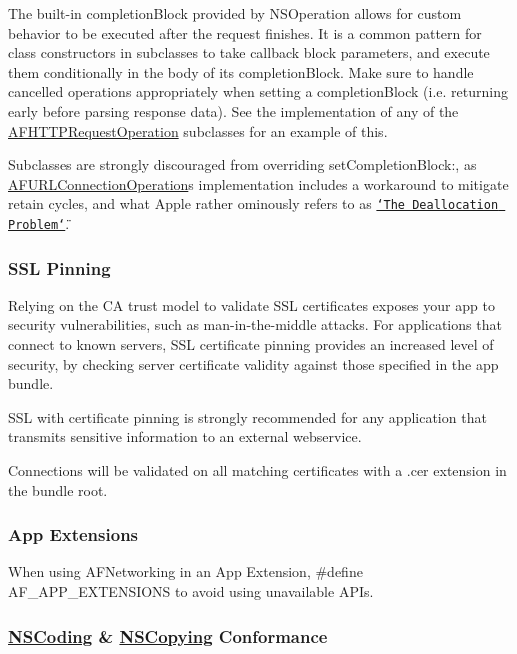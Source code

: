 The built-\/in {\ttfamily completion\+Block} provided by {\ttfamily N\+S\+Operation} allows for custom behavior to be executed after the request finishes. It is a common pattern for class constructors in subclasses to take callback block parameters, and execute them conditionally in the body of its {\ttfamily completion\+Block}. Make sure to handle cancelled operations appropriately when setting a {\ttfamily completion\+Block} (i.\+e. returning early before parsing response data). See the implementation of any of the {\ttfamily \hyperlink{interface_a_f_h_t_t_p_request_operation}{A\+F\+H\+T\+T\+P\+Request\+Operation}} subclasses for an example of this.

Subclasses are strongly discouraged from overriding {\ttfamily set\+Completion\+Block\+:}, as {\ttfamily \hyperlink{interface_a_f_u_r_l_connection_operation}{A\+F\+U\+R\+L\+Connection\+Operation}}\textquotesingle{}s implementation includes a workaround to mitigate retain cycles, and what Apple rather ominously refers to as \href{http://developer.apple.com/library/ios/#technotes/tn2109/}{\tt \char`\"{}\+The Deallocation Problem\char`\"{}}.

\subsubsection*{S\+S\+L Pinning}

Relying on the C\+A trust model to validate S\+S\+L certificates exposes your app to security vulnerabilities, such as man-\/in-\/the-\/middle attacks. For applications that connect to known servers, S\+S\+L certificate pinning provides an increased level of security, by checking server certificate validity against those specified in the app bundle.

S\+S\+L with certificate pinning is strongly recommended for any application that transmits sensitive information to an external webservice.

Connections will be validated on all matching certificates with a {\ttfamily .cer} extension in the bundle root.

\subsubsection*{App Extensions}

When using A\+F\+Networking in an App Extension, {\ttfamily \#define A\+F\+\_\+\+A\+P\+P\+\_\+\+E\+X\+T\+E\+N\+S\+I\+O\+N\+S} to avoid using unavailable A\+P\+Is.

\subsubsection*{\hyperlink{class_n_s_coding-p}{N\+S\+Coding} \& \hyperlink{class_n_s_copying-p}{N\+S\+Copying} Conformance}

